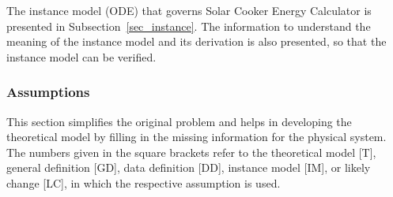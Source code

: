 \documentclass[12pt]{article}
\begin{document}
The instance model (ODE) that governs Solar Cooker
Energy Calculator is presented in
Subsection~\ref{sec_instance}.  The information to understand the meaning of the
instance model and its derivation is also presented, so that the instance
model can be verified.

\subsubsection{Assumptions} \label{sec_assumpt}


This section simplifies the original problem and helps in developing the
theoretical model by filling in the missing information for the physical
system. The numbers given in the square brackets refer to the theoretical model
[T], general definition [GD], data definition [DD], instance model [IM], or
likely change [LC], in which the respective assumption is used.
\end{document}
